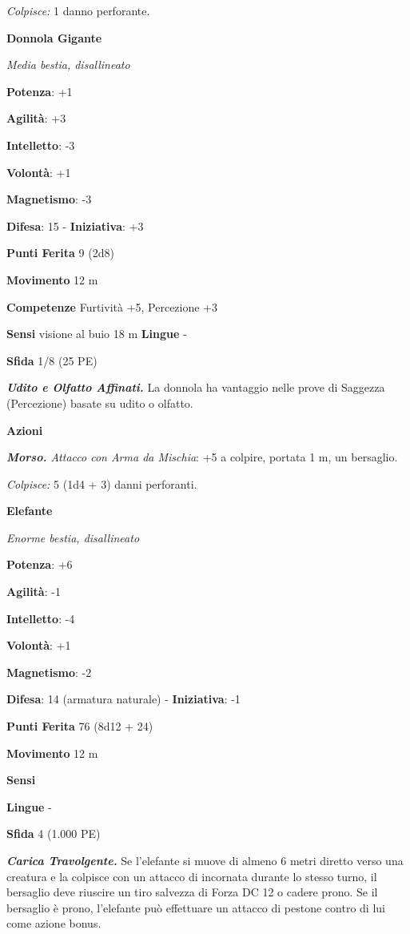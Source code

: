 \begin{multicols}{2}
\emph{Colpisce:} 1 danno perforante.

\textbf{Donnola Gigante}

\emph{Media bestia, disallineato}

\textbf{Potenza}: +1

\textbf{Agilità}: +3

\textbf{Intelletto}: -3

\textbf{Volontà}: +1

\textbf{Magnetismo}: -3

\textbf{Difesa}: 15 - \textbf{Iniziativa}: +3

\textbf{Punti Ferita} 9 (2d8)

\textbf{Movimento} 12 m

\textbf{Competenze} Furtività +5, Percezione +3

\textbf{Sensi} visione al buio 18 m
\textbf{Lingue} -

\textbf{Sfida} 1/8 (25 PE)\smallskip

\emph{\textbf{Udito e Olfatto Affinati.}} La donnola ha vantaggio nelle
prove di Saggezza (Percezione) basate su udito o olfatto.

\smallskip\textbf{Azioni}

\emph{\textbf{Morso.} Attacco con Arma da Mischia}: +5 a colpire,
portata 1 m, un bersaglio.

\emph{Colpisce:} 5 (1d4 + 3) danni perforanti.

\textbf{Elefante}

\emph{Enorme bestia, disallineato}

\textbf{Potenza}: +6

\textbf{Agilità}: -1

\textbf{Intelletto}: -4

\textbf{Volontà}: +1

\textbf{Magnetismo}: -2

\textbf{Difesa}: 14 (armatura naturale) - \textbf{Iniziativa}: -1

\textbf{Punti Ferita} 76 (8d12 + 24)

\textbf{Movimento} 12 m

\textbf{Sensi} 

\textbf{Lingue} -

\textbf{Sfida} 4 (1.000 PE)\smallskip

\emph{\textbf{Carica Travolgente.}} Se l'elefante si muove di almeno 6
metri diretto verso una creatura e la colpisce con un attacco di
incornata durante lo stesso turno, il bersaglio deve riuscire un tiro
salvezza di Forza DC 12 o cadere prono. Se il bersaglio è prono,
l'elefante può effettuare un attacco di pestone contro di lui come
azione bonus.


\end{multicols}
